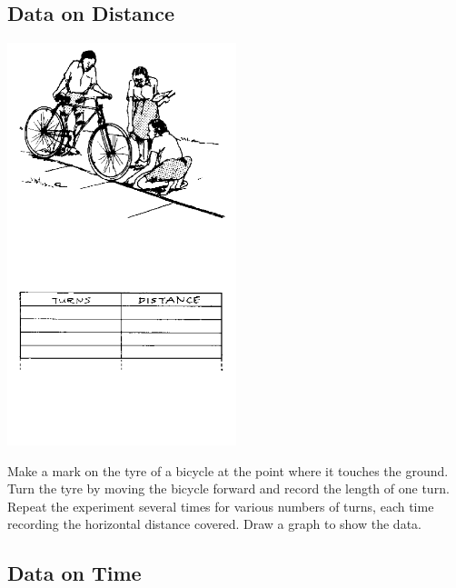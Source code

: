 \begin{multicols}{2}
\vfill
\columnbreak

\subsection{Data on Distance}

\begin{center}
\includegraphics[width=0.5\textwidth]{./img/source/meas-distance.png}
\end{center}

Make a mark on the tyre of a bicycle at the point where it touches the ground. Turn the tyre by moving the bicycle forward and record the length of one turn. Repeat the experiment several times for various numbers of turns, each time recording the horizontal distance covered. Draw a graph to show the data.

\vfill
\columnbreak

\subsection{Data on Time}


\end{multicols}
